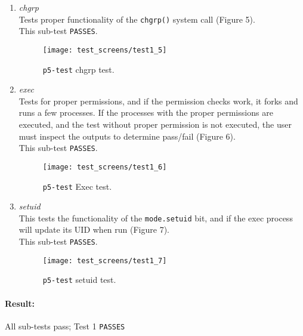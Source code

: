 \documentclass[11pt,letterpaper]{report}
\begin{document}
\begin{enumerate}
		\item \emph{chgrp}\\
		Tests proper functionality of the {\tt chgrp()} system call ({\color{red}Figure 5}).\\
		This sub-test {\tt PASSES}.
		
		\begin{figure}
			\centering
			\texttt{[image: test\_screens/test1\_5]}
			\caption{{\tt p5-test} chgrp test.}
			\label{fig:test15}
		\end{figure}
	
		\item \emph{exec}\\
		Tests for proper permissions, and if the permission checks work, it forks and runs a few processes. If the processes with the proper permissions are executed, and the test without proper permission is not executed, the user must inspect the outputs to determine pass/fail ({\color{red}Figure 6}).\\
		This sub-test {\tt PASSES}.
		
		\begin{figure}
			\centering
			\texttt{[image: test\_screens/test1\_6]}
			\caption{{\tt p5-test} Exec test.}
			\label{fig:test16}
		\end{figure}
	
		\item \emph{setuid}\\
		This tests the functionality of the {\tt mode.setuid} bit, and if the exec process will update its UID when run ({\color{red}Figure 7}).\\
		This sub-test {\tt PASSES}.
		
		\begin{figure}
			\centering
			\texttt{[image: test\_screens/test1\_7]}
			\caption{{\tt p5-test} setuid test.}
			\label{fig:test17}
		\end{figure}
	
	\end{enumerate}

	\paragraph{Result:} All sub-tests pass; Test 1 {\tt PASSES}
	
	
\end{document}
